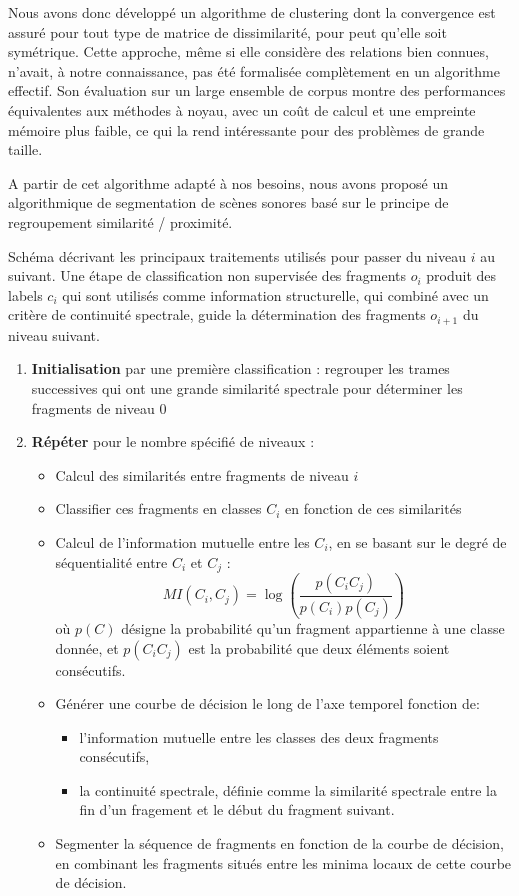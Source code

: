Nous avons donc développé un algorithme de clustering dont la convergence est assuré pour tout type de matrice de dissimilarité, pour peut qu'elle soit symétrique. Cette approche, même si elle considère des relations bien connues, n'avait, à notre connaissance, pas été formalisée complètement en un algorithme effectif. Son évaluation sur un large ensemble de corpus \cite{keogh} montre des performances équivalentes aux méthodes à noyau, avec un coût de calcul et une empreinte mémoire plus faible, ce qui la rend intéressante pour des problèmes de grande taille\cite{rossignolKaverages}.

A partir de cet algorithme adapté à nos besoins, nous avons proposé un algorithmique de segmentation de scènes sonores basé sur le principe de regroupement similarité / proximité\cite{rossignolhal-01122006}.


Schéma décrivant les principaux traitements utilisés pour passer du niveau $i$ au suivant. Une étape de classification non supervisée des fragments $o_i$ produit des labels $c_i$ qui sont utilisés comme information structurelle, qui combiné avec un critère de continuité spectrale, guide la détermination des fragments $o_{i+1}$ du niveau suivant.

\begin{enumerate}
\item \textbf{Initialisation} par une première classification : regrouper les trames successives qui ont une grande similarité spectrale pour déterminer les fragments de niveau 0
\item \textbf{Répéter} pour le nombre spécifié de niveaux :
  \begin{itemize}
  \item Calcul des similarités entre fragments de niveau $i$
  \item Classifier ces fragments en classes $C_i$ en fonction de ces similarités
  \item Calcul de l'information mutuelle entre les $C_i$, en se basant sur le degré de séquentialité entre $C_i$ et $C_j$ :
    \[ MI \left( C_i, C_j \right) = \log \left(\frac{p\left(C_iC_j\right)}{p\left(C_i\right)p\left(C_j\right)}\right) \]
    où $p(C)$ désigne la probabilité qu'un fragment appartienne à une classe donnée, et $p(C_iC_j)$ est la probabilité que deux éléments soient consécutifs.
  \item Générer une courbe de décision le long de l'axe temporel fonction de:
    \begin{itemize}
    \item l'information mutuelle entre les classes des deux fragments consécutifs,
    \item la continuité spectrale, définie comme la similarité spectrale entre la fin d'un fragement et le début du fragment suivant.
      \end{itemize}
  \item Segmenter la séquence de fragments en fonction de la courbe de décision, en combinant les fragments situés entre les minima locaux de cette courbe de décision.
  \end{itemize}
\end{enumerate}

